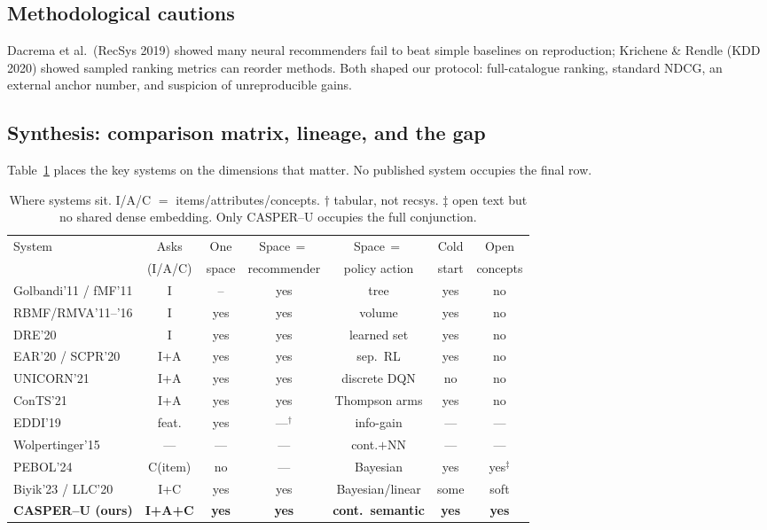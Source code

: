 \subsection{Methodological cautions}
Dacrema et al.\ (RecSys 2019) showed many neural recommenders fail to beat simple baselines on reproduction;
Krichene \& Rendle (KDD 2020) showed sampled ranking metrics can reorder methods. Both shaped our protocol:
full-catalogue ranking, standard NDCG, an external anchor number, and suspicion of unreproducible gains.

\subsection{Synthesis: comparison matrix, lineage, and the gap}
Table~\ref{tab:matrix} places the key systems on the dimensions that matter. No published system occupies the
final row.

\begin{table}[h]\centering\small
\setlength{\tabcolsep}{4pt}
\begin{tabular}{lcccccc}
\toprule
System & Asks & One & Space\,$=$ & Space\,$=$ & Cold & Open\\
 & (I/A/C) & space & recommender & policy action & start & concepts\\
\midrule
Golbandi'11 / fMF'11      & I       & --  & yes & tree     & yes & no\\
RBMF/RMVA'11--'16         & I       & yes & yes & volume   & yes & no\\
DRE'20                    & I       & yes & yes & learned set & yes & no\\
EAR'20 / SCPR'20          & I+A     & yes & yes & sep.\ RL & yes & no\\
UNICORN'21                & I+A     & yes & yes & discrete DQN & no  & no\\
ConTS'21                  & I+A     & yes & yes & Thompson arms & yes & no\\
EDDI'19                   & feat.   & yes & ---$^\dagger$ & info-gain & ---  & ---\\
Wolpertinger'15           & ---     & ---  & ---  & cont.$+$NN & ---  & ---\\
PEBOL'24                  & C(item) & no  & ---  & Bayesian & yes & yes$^\ddagger$\\
Biyik'23 / LLC'20         & I+C     & yes & yes & Bayesian/linear & some & soft\\
\textbf{CASPER--U (ours)} & \textbf{I+A+C} & \textbf{yes} & \textbf{yes} & \textbf{cont.\ semantic} & \textbf{yes} & \textbf{yes}\\
\bottomrule
\end{tabular}
\caption{Where systems sit. I/A/C $=$ items/attributes/concepts. $\dagger$ tabular, not recsys. $\ddagger$ open
text but no shared dense embedding. Only CASPER--U occupies the full conjunction.}
\label{tab:matrix}
\end{table}

